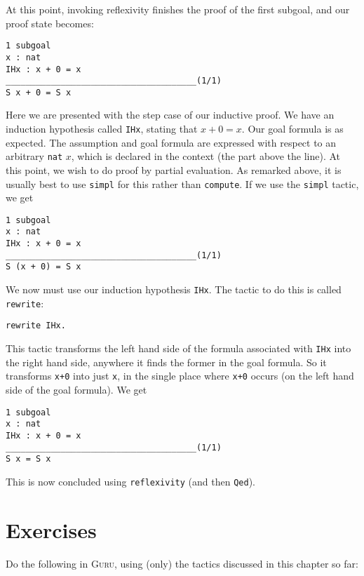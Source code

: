 \documentclass{book}[12pt]
\newcommand{\guru}[0]{\textsc{Guru}}
\begin{document}
\noindent At this point, invoking reflexivity finishes the proof of the
first subgoal, and our proof state becomes:

\begin{verbatim}
1 subgoal
x : nat
IHx : x + 0 = x
______________________________________(1/1)
S x + 0 = S x
\end{verbatim}

\noindent Here we are presented with the step case of our inductive
proof.  We have an induction hypothesis called \texttt{IHx}, stating
that $x + 0 = x$.  Our goal formula is as expected.  The assumption
and goal formula are expressed with respect to an arbitrary
\texttt{nat} $x$, which is declared in the context (the part above the
line).  At this point, we wish to do proof by partial evaluation.  As
remarked above, it is usually best to use \texttt{simpl} for this
rather than \texttt{compute}.  If we use the \texttt{simpl} tactic, we
get

\begin{verbatim}
1 subgoal
x : nat
IHx : x + 0 = x
______________________________________(1/1)
S (x + 0) = S x
\end{verbatim}

\noindent We now must use our induction hypothesis \texttt{IHx}.  The tactic
to do this is called \texttt{rewrite}:

\begin{verbatim}
rewrite IHx.
\end{verbatim}

\noindent This tactic transforms the left hand side of the formula
associated with \texttt{IHx} into the right hand side, anywhere it
finds the former in the goal formula.  So it transforms \texttt{x+0}
into just \texttt{x}, in the single place where \texttt{x+0} occurs
(on the left hand side of the goal formula).  We get

\begin{verbatim}
1 subgoal
x : nat
IHx : x + 0 = x
______________________________________(1/1)
S x = S x
\end{verbatim}

\noindent This is now concluded using \texttt{reflexivity} (and then
\texttt{Qed}).

\section{Exercises}

Do the following in \guru, using (only) the tactics discussed in
this chapter so far:
\end{document}
